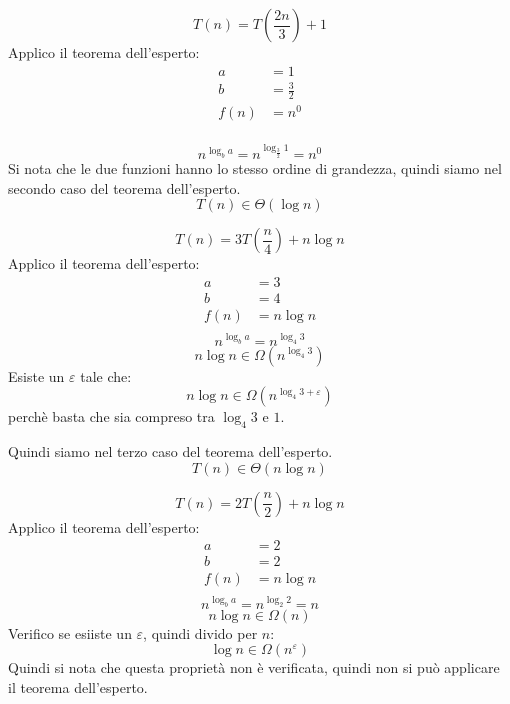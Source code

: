 \documentclass[a4paper]{article}
\begin{document}
\begin{example}
  \[
  T(n) = T \left( \frac{2n}{3} \right) + 1
  \] 
  Applico il teorema dell'esperto:
  \[
    \begin{aligned}
      a & = 1\\
      b & = \frac{3}{2}\\
      f(n) & = n^0\\
    \end{aligned}
  \]

  \[
    n^{\log_b a} = n^{\log_{\frac{3}{2}} 1} = n^0
  \] 
  Si nota che le due funzioni hanno lo stesso ordine di grandezza, quindi siamo nel secondo
  caso del teorema dell'esperto.
  \[
    T(n) \in \Theta(\log n)
  \] 
\end{example}

\begin{example}
  \[
    T(n) = 3T \left( \frac{n}{4} \right) + n \log n
  \] 
  Applico il teorema dell'esperto:
  \[
    \begin{aligned}
      a & = 3\\
      b & = 4\\
      f(n) & = n \log n\\
    \end{aligned}
  \]
  \[
    n^{\log_b a} = n^{\log_4 3}
  \]
  \[
    n \log n \in \Omega(n^{\log_4 3})
  \]
  Esiste un \( \varepsilon \) tale che:
  \[
    n \log n \in \Omega(n^{\log_4 3 + \varepsilon})
  \]
  perchè basta che sia compreso tra \( \log_4 3 \) e \( 1 \).
  
  \vspace{1em}
  \noindent
  Quindi siamo nel terzo caso del teorema dell'esperto.
  \[
    T(n) \in \Theta(n \log n)
  \]
\end{example}

\begin{example}
  \[
  T(n) = 2T \left( \frac{n}{2} \right) + n \log n
  \] 
  Applico il teorema dell'esperto:
  \[
    \begin{aligned}
      a & = 2\\
      b & = 2\\
      f(n) & = n \log n\\
    \end{aligned}
  \]
  \[
    n^{\log_b a} = n^{\log_2 2} = n
  \]
  \[
    n \log n \in \Omega(n)
  \]
  Verifico se esiiste un \( \varepsilon \), quindi divido per \( n \):
  \[
    \log n \in \Omega(n^{\varepsilon})
  \] 
  Quindi si nota che questa proprietà non è verificata, quindi non si può applicare il
  teorema dell'esperto.
\end{example}
\end{document}
